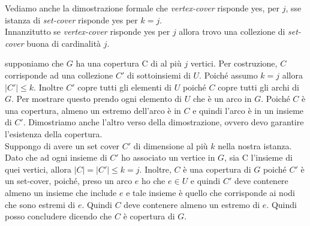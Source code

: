 Vediamo anche la dimostrazione formale che \textit{vertex-cover} risponde yes, per $j$, sse istanza di \textit{set-cover} risponde yes per $k=j$.\\ Innanzitutto se \textit{vertex-cover} risponde yes per $j$ allora trovo una collezione di \textit{set-cover} buona di cardinalità $j$. 

supponiamo che $G$ ha una copertura C di al più $j$ vertici. Per costruzione, $C$ corrisponde ad una collezione $C'$ di sottoinsiemi di $U$. Poiché assumo $k=j$ allora $|C'|\leq k$. Inoltre $C'$ copre tutti gli elementi di $U$ poiché $C$ copre tutti gli archi di $G$. Per mostrare questo prendo ogni elemento di $U$ che è un arco in $G$. Poiché $C$ è una copertura,
almeno un estremo dell'arco è in $C$ e quindi l'arco è in un insieme di $C'$. Dimostriamo anche l'altro verso della dimostrazione, ovvero devo garantire l'esistenza della copertura. \\
Suppongo di avere un set cover $C'$ di dimensione al più $k$ nella nostra istanza. Dato che ad ogni insieme di $C'$ ho associato un vertice in $G$,  sia C l’insieme di quei vertici, allora $|C|=|C'|\leq k=j$. Inoltre, $C$ è una copertura di $G$ poiché $C'$ è un set-cover, poiché, preso un arco $e$ ho che $e\in U$ e quindi $C'$ deve contenere almeno un insieme che include $e$ e tale insieme è quello che corrisponde ai nodi che sono estremi di $e$. Quindi $C$ deve contenere almeno un estremo di $e$. Quindi posso concludere dicendo che $C$ è copertura di $G$.